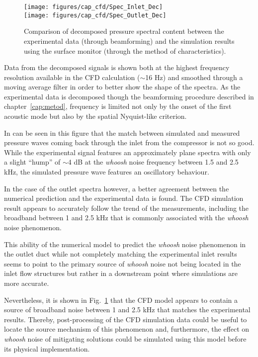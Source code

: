 \begin{figure}[htb!]
\centering
\texttt{[image: figures/cap\_cfd/Spec\_Inlet\_Dec]}\\[5mm]
\texttt{[image: figures/cap\_cfd/Spec\_Outlet\_Dec]}
\caption[Comparison of decomposed plane wave CFD spectrum (wall)]{Comparison of decomposed pressure spectral content between the experimental data (through beamforming) and the simulation results using the surface monitor (through the method of characteristics).}
\label{fig:cfd_Spec_PlaneW_Dec}
\end{figure}

Data from the decomposed signals is shown both at the highest frequency resolution available in the CFD calculation ($\sim$16 Hz) and smoothed through a moving average filter in order to better show the shape of the spectra. As the experimental data is decomposed though the beamforming procedure described in chapter~\ref{cap:metod}, frequency is limited not only by the onset of the first acoustic mode but also by the spatial Nyquist-like criterion.

In can be seen in this figure that the match between simulated and measured pressure waves coming back through the inlet from the compressor is not so good. While the experimental signal features an approximately plane spectra with only a slight ``hump'' of $\sim$4 dB at the \emph{whoosh} noise frequency between 1.5 and 2.5 kHz, the simulated pressure wave features an oscillatory behaviour.

In the case of the outlet spectra however, a better agreement between the numerical prediction and the experimental data is found. The CFD simulation result appears to accurately follow the trend of the measurements, including the broadband between 1 and 2.5 kHz that is commonly associated with the \emph{whoosh} noise phenomenon.

This ability of the numerical model to predict the \emph{whoosh} noise phenomenon in the outlet duct while not completely matching the experimental inlet results seems to point to the primary source of \emph{whoosh} noise not being located in the inlet flow structures but rather in a downstream point where simulations are more accurate.

Nevertheless, it is shown in Fig.~\ref{fig:cfd_Spec_PlaneW_Dec} that the CFD model appears to contain a source of broadband noise between 1 and 2.5 kHz that matches the experimental results. Thereby, post-processing of the CFD simulation data could be useful to locate the source mechanism of this phenomenon and, furthermore, the effect on \emph{whoosh} noise of mitigating solutions could be simulated using this model before its physical implementation. 

